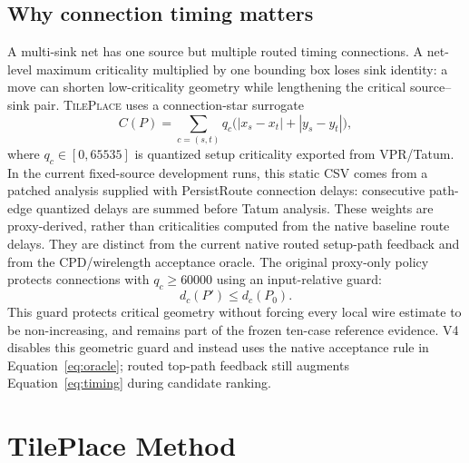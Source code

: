 \documentclass[sigconf,anonymous,review]{acmart}
\newcommand{\system}{\textsc{TilePlace}}
\newcommand{\vpr}{\textsc{VPR}}
\begin{document}
\subsection{Why connection timing matters}

A multi-sink net has one source but multiple routed timing connections.  A
net-level maximum criticality multiplied by one bounding box loses sink
identity: a move can shorten low-criticality geometry while lengthening the
critical source--sink pair.  \system{} uses a connection-star surrogate
\begin{equation}
 C(P)=\sum_{c=(s,t)} q_c\bigl(|x_s-x_t|+|y_s-y_t|\bigr),
 \label{eq:timing}
\end{equation}
where $q_c\in[0,65535]$ is quantized setup criticality exported from
\vpr{}/Tatum. In the current fixed-source development runs, this static CSV
comes from a patched analysis supplied with PersistRoute connection delays:
consecutive path-edge quantized delays are summed before Tatum analysis.
These weights are proxy-derived, rather than criticalities computed from the
native baseline route delays. They are distinct from the current native
routed setup-path feedback and from the CPD/wirelength acceptance oracle.
The original proxy-only policy protects connections with
$q_c\ge 60000$ using an input-relative guard:
\begin{equation}
 d_c(P') \le d_c(P_0).
 \label{eq:guard}
\end{equation}
This guard protects critical geometry without forcing every local wire
estimate to be non-increasing, and remains part of the frozen ten-case
reference evidence.  V4 disables this geometric guard and instead uses the
native acceptance rule in Equation~\ref{eq:oracle}; routed top-path feedback
still augments Equation~\ref{eq:timing} during candidate ranking.

\section{TilePlace Method}
\end{document}
